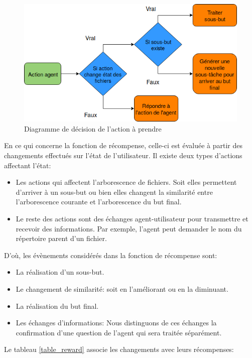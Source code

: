 \begin{figure}[H] 
	\centering
	\includegraphics[width=0.8\linewidth]{images/Conception/DM/action_diag.png}
	\caption{Diagramme de décision de l'action à prendre}\label{action_diag}
	
\end{figure}
\par En ce qui concerne la fonction de récompense, celle-ci est évaluée à partir des changements effectués sur l'état de l'utilisateur. Il existe deux types d'actions affectant l'état:
\begin{itemize}
	\item Les actions qui affectent l'arborescence de fichiers. Soit elles permettent d'arriver à un sous-but ou bien elles changent la similarité entre l'arborescence courante et l'arborescence du but final.
	\item Le reste des actions sont des échanges agent-utilisateur pour transmettre et recevoir des informations. Par exemple, l'agent peut demander le nom du répertoire parent d'un fichier.
\end{itemize}
D'où, les évènements considérés dans la fonction de récompense sont:
\begin{itemize}
	\item La réalisation d'un sous-but.
	\item Le changement de similarité: soit en l'améliorant ou en la diminuant.
	\item La réalisation du but final.
	\item Les échanges d'informations: Nous distinguons de ces échanges la confirmation d'une question de l'agent qui sera traitée séparément.
\end{itemize}
Le tableau \ref{table_reward} associe les changements avec leurs récompenses:
